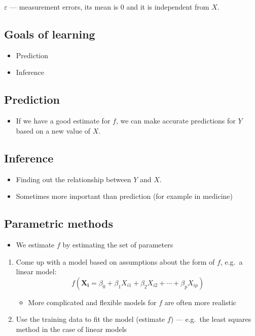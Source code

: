 \documentclass{article}
\begin{document}
    $\varepsilon$ --- measurement errors, its mean is 0 and it is independent from $X$.

    \subsection{Goals of learning}
    \begin{itemize}
        \item Prediction
        \item Inference
    \end{itemize}

    \subsection{Prediction}
    \begin{itemize}
        \item If we have a good estimate for $f$, we can make accurate predictions for $Y$ based on a new value of $X$.
    \end{itemize}

    \subsection{Inference}
    \begin{itemize}
        \item Finding out the relationship between $Y$ and $X$.
        \item Sometimes more important than prediction (for example in medicine)
    \end{itemize}

    \subsection{Parametric methods}
    \begin{itemize}
        \item We estimate $f$ by estimating the set of parameters
    \end{itemize}

    \begin{enumerate}
        \item Come up with a model based on assumptions about the form of $f$, e.g.\ a linear model: \\
        \[
            f(\mathbf{X_i} = \beta_0 + \beta_1 X_{i1} + \beta_2 X_{i2} + \cdots + \beta_p X_{ip})
        \]
        \begin{itemize}
            \item More complicated and flexible models for $f$ are often more realistic
        \end{itemize}
        \item Use the training data to fit the model (estimate $f$) --- e.g.\ the least squares method in the case of linear models
    \end{enumerate}
\end{document}

